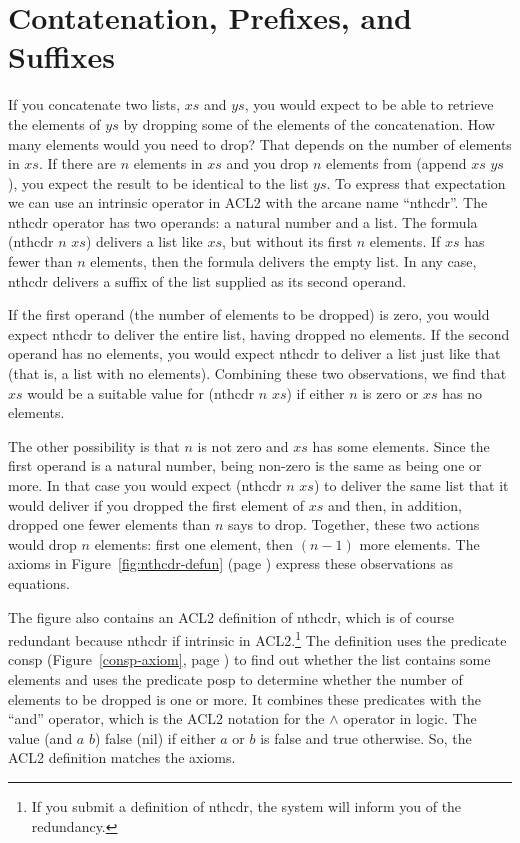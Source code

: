 \section{Contatenation, Prefixes, and Suffixes}
\label{sec:append-prefix-suffix}

If you concatenate two lists, $xs$ and $ys$,
you would expect to be able to retrieve the elements
of $ys$ by dropping some of the elements of the concatenation.
How many elements would you need to drop?
That depends on the number of elements in $xs$.
If there are $n$ elements in $xs$ and you drop $n$ elements
from (append $xs$ $ys$), you expect the result to be identical
to the list $ys$. To express that expectation we can use
an intrinsic operator in ACL2 with the arcane name ``nthcdr''.
The nthcdr operator has two operands: a natural number and a list.
The formula (nthcdr $n$ $xs$) delivers a list like $xs$,
but without its first $n$ elements.
If $xs$ has fewer than $n$ elements,
then the formula delivers the empty list.
In any case, nthcdr delivers a suffix of the list
supplied as its second operand.

If the first operand (the number of elements to be dropped) is zero,
you would expect
nthcdr to deliver the entire list, having dropped no elements.
If the second operand has no elements,
you would expect
nthcdr to deliver a list just like that
(that is, a list with no elements).
Combining these two observations, we find that
$xs$ would be a suitable value for (nthcdr $n$ $xs$)
if either $n$ is zero or $xs$ has no elements.

The other possibility is that $n$ is not zero and $xs$ has some elements.
Since the first operand is a natural number,
being non-zero is the same as being one or more.
In that case you would expect (nthcdr $n$ $xs$) to deliver
the same list that it would deliver
if you dropped the first element of $xs$
and then, in addition, dropped one fewer elements than $n$ says to drop.
Together, these two actions would drop $n$ elements:
first one element, then $(n - 1)$ more elements.
The axioms in Figure~\ref{fig:nthcdr-defun} (page \pageref{fig:nthcdr-defun})
express these observations as equations.

The figure also contains an ACL2 definition of nthcdr, which
is of course redundant because nthcdr if intrinsic in ACL2.\footnote{If
you submit a definition of nthcdr,
the system will inform you of the redundancy.}
The definition uses the predicate consp
(Figure~\ref{consp-axiom}, page \pageref{consp-axiom})
to find out whether the list contains some elements and
uses the predicate
\label{posp-def} posp
to determine whether
the number of elements to be dropped is one or more.
It combines these predicates with the ``and'' operator,
which is the ACL2 notation for the $\wedge$ operator in logic.
\label{and-op=informal}
The value (and $a$ $b$) false (nil)
if either $a$ or $b$ is false and true otherwise.
So, the ACL2 definition matches the axioms.

